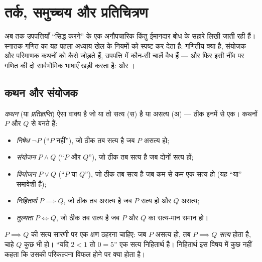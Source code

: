 \chapter{तर्क, समुच्चय और प्रतिचित्रण}\label{ch:b1:logic}

अब तक उपपत्तियाँ ``सिद्ध करने'' के एक अनौपचारिक किंतु ईमानदार बोध के सहारे
लिखी जाती रही हैं। स्नातक गणित का यह पहला अध्याय खेल के नियमों को स्पष्ट कर
देता है: गणितीय  क्या है, संयोजक और परिमाणक कथनों को कैसे जोड़ते हैं,
उपपत्ति में कौन-सी चालें वैध हैं --- और फिर इसी नींव पर गणित की दो
सार्वभौमिक भाषाएँ खड़ी करता है:  और ।

\section{कथन और संयोजक}

\begin{definition}[कथन, संयोजक]\label{def:b1:logic:statement}
\emph{कथन} (या \emph{प्रतिज्ञप्ति}) ऐसा वाक्य है जो या तो सत्य
(स) है या असत्य (अ) --- ठीक इनमें से एक। कथनों $P$ और $Q$ से बनते हैं:
\begin{itemize}
  \item \emph{निषेध} $\lnot P$ (``$P$ नहीं''), जो ठीक तब सत्य है जब $P$
  असत्य हो;
  \item \emph{संयोजन} $P \land Q$ (``$P$ और $Q$''), जो ठीक तब सत्य है जब
  दोनों सत्य हों;
  \item \emph{वियोजन} $P \lor Q$ (``$P$ या $Q$''), जो ठीक तब सत्य है जब कम
  से कम एक सत्य हो (यह ``या'' समावेशी है);
  \item \emph{निहितार्थ} $P \implies Q$, जो ठीक तब असत्य है जब $P$ सत्य हो
  और $Q$ असत्य;
  \item \emph{तुल्यता} $P \iff Q$, जो ठीक तब सत्य है जब $P$ और $Q$ का
  सत्य-मान समान हो।
\end{itemize}
\end{definition}

\begin{remark}
$P \implies Q$ की सत्य सारणी पर एक क्षण ठहरना चाहिए: जब $P$ असत्य हो, तब $P
\implies Q$ \emph{सत्य} होता है, चाहे $Q$ कुछ भी हो। ``यदि $2 < 1$ तो $0 =
5$'' एक सत्य निहितार्थ है। निहितार्थ इस विषय में कुछ नहीं कहता कि उसकी
परिकल्पना विफल होने पर क्या होता है।
\end{remark}

